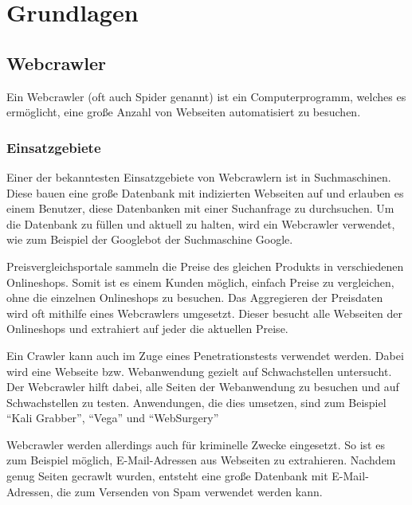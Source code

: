 \chapter{Grundlagen}
\section{Webcrawler}
Ein Webcrawler (oft auch Spider genannt) ist ein Computerprogramm, welches es ermöglicht, eine große Anzahl von Webseiten automatisiert zu besuchen.
\subsection{Einsatzgebiete}
Einer der bekanntesten Einsatzgebiete von Webcrawlern ist in Suchmaschinen. Diese bauen eine große Datenbank mit indizierten Webseiten auf und erlauben es einem Benutzer, diese Datenbanken mit einer Suchanfrage zu durchsuchen. Um die Datenbank zu füllen und aktuell zu halten, wird ein Webcrawler verwendet, wie zum Beispiel der Googlebot der Suchmaschine Google. \cite{Googlebot} 

Preisvergleichsportale sammeln die Preise des gleichen Produkts in verschiedenen Onlineshops. Somit ist es einem Kunden möglich, einfach Preise zu vergleichen, ohne die einzelnen Onlineshops zu besuchen. Das Aggregieren der Preisdaten wird oft mithilfe eines Webcrawlers umgesetzt. Dieser besucht alle Webseiten der Onlineshops und extrahiert auf jeder die aktuellen Preise. \cite{WebshopCrawling} 

Ein Crawler kann auch im Zuge eines Penetrationstests verwendet werden. Dabei wird eine Webseite bzw. Webanwendung gezielt auf Schwachstellen untersucht. Der Webcrawler hilft dabei, alle Seiten der Webanwendung zu besuchen und auf Schwachstellen zu testen. Anwendungen, die dies umsetzen, sind zum Beispiel \enquote{Kali Grabber}\cite{KaliGrabber}, \enquote{Vega}\cite{Vega} und \enquote{WebSurgery}\cite{WebSurgery} 

Webcrawler werden allerdings auch für kriminelle Zwecke eingesetzt. So ist es zum Beispiel möglich, E-Mail-Adressen aus Webseiten zu extrahieren. Nachdem genug Seiten gecrawlt wurden, entsteht eine große Datenbank mit E-Mail-Adressen, die zum Versenden von Spam verwendet werden kann. \cite{EmailHarvesting} \\
